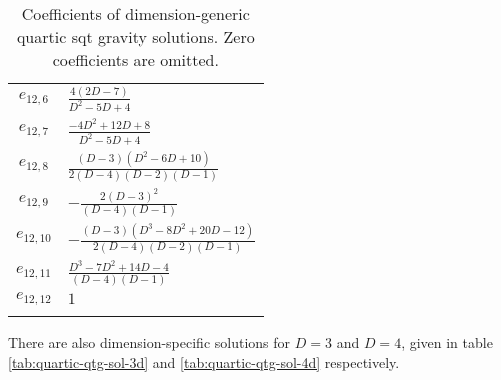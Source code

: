 \documentclass[a4paper,11pt]{article}
\begin{document}
\begin{longtable}{|c|l|}
    $e_{12, 6}$ & $\frac{4 (2 D-7)}{D^2-5 D+4}$ \\
    $e_{12, 7}$ & $\frac{-4 D^2+12 D+8}{D^2-5 D+4}$ \\
    $e_{12, 8}$ & $\frac{(D-3) \left(D^2-6 D+10\right)}{2 (D-4) (D-2) (D-1)}$ \\
    $e_{12, 9}$ & $-\frac{2 (D-3)^2}{(D-4) (D-1)}$ \\
    $e_{12, 10}$ & $-\frac{(D-3) \left(D^3-8 D^2+20 D-12\right)}{2 (D-4) (D-2) (D-1)}$ \\
    $e_{12, 11}$ & $\frac{D^3-7 D^2+14 D-4}{(D-4) (D-1)}$ \\
    $e_{12, 12}$ & $1$ \\
    \hline
    \caption{Coefficients of dimension-generic quartic \ac{sqt} gravity solutions. Zero coefficients are omitted.}
    \label{tab:quartic-qtg-dimgen-sol}
\end{longtable}
There are also dimension-specific solutions for $D = 3$ and $D = 4$, given in table \ref{tab:quartic-qtg-sol-3d} and \ref{tab:quartic-qtg-sol-4d} respectively.
\end{document}
